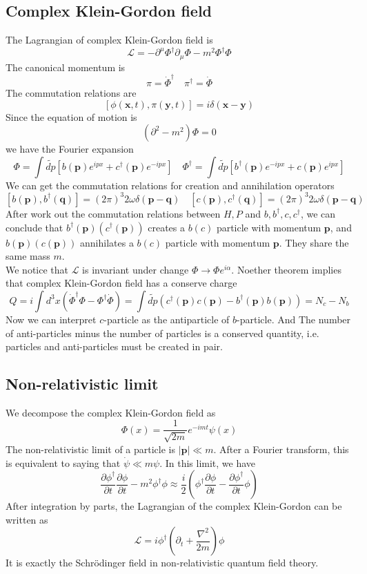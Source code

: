 \subsection{Complex Klein-Gordon field}
The Lagrangian of complex Klein-Gordon field is
\[\mathcal{L} = - \partial^{\mu}\Phi^{\dagger}\partial_{\mu}\Phi - m^2\Phi^{\dagger}\Phi\]
The canonical momentum is
\[\pi = \dot{\Phi}^{\dagger} \quad \pi^{\dagger} = \dot{\Phi}\]
The commutation relations are
\[[\phi(\bm{x},t),\pi(\bm{y},t)] = i\delta(\bm{x}-\bm{y})\]
Since the equation of motion is
\[(\partial^2-m^2)\Phi = 0\]
we have the Fourier expansion
\[\Phi = \int \widetilde{dp} [b(\bm{p})e^{ipx} + c^{\dagger}(\bm{p})e^{-ipx}] \quad \Phi^{\dagger} = \int \widetilde{dp} [b^{\dagger}(\bm{p})e^{-ipx} + c(\bm{p})e^{ipx}]\]
We can get the commutation relations for creation and annihilation operators
\[[b(\bm{p}), b^{\dagger}(\bm{q})] = (2\pi)^3 2\omega \delta(\bm{p}-\bm{q}) \quad [c(\bm{p}), c^{\dagger}(\bm{q})] = (2\pi)^3 2\omega \delta(\bm{p}-\bm{q})\]
After work out the commutation relations between $H,P$ and $b,b^{\dagger},c,c^{\dagger}$, we can conclude that $b^{\dagger}(\bm{p})(c^{\dagger}(\bm{p}))$ creates a $b(c)$ particle with momentum $\bm{p}$, and $b(\bm{p})(c(\bm{p}))$ annihilates a $b(c)$ particle with momentum $\bm{p}$. They share the same mass $m$.
\\
We notice that $\mathcal{L}$ is invariant under change $\Phi \to \Phi e^{i\alpha}$. Noether theorem implies that complex Klein-Gordon field has a conserve charge
\[Q = i\int d^3x (\dot{\Phi}^{\dagger}\Phi - \Phi^{\dagger}\dot{\Phi}) = \int \widetilde{dp} (c^{\dagger}(\bm{p})c(\bm{p}) - b^{\dagger}(\bm{p})b(\bm{p})) = N_c - N_b\]
Now we can interpret $c$-particle as the antiparticle of $b$-particle. And The number of anti-particles minus the number of particles is a conserved quantity, i.e. particles and anti-particles must be created in pair.

\subsection{Non-relativistic limit}
We decompose the complex Klein-Gordon field as
\[\Phi(x) = \frac{1}{\sqrt{2m}} e^{-imt}\psi(x)\]
The non-relativistic limit of a particle is $|\bm{p}| \ll m$. After a Fourier transform, this is equivalent to saying that $\dot{\psi} \ll m\psi $. In this limit, we have
\[\frac{\partial \phi^{\dagger}}{\partial t} \frac{\partial \phi}{\partial t} - m^2 \phi^{\dagger}\phi \approx \frac{i}{2} \left( \phi^{\dagger}\frac{\partial \phi}{\partial t} - \frac{\partial \phi^{\dagger}}{\partial t} \phi\right)\]
After integration by parts, the Lagrangian of the complex Klein-Gordon can be written as
\[\mathcal{L} = i\phi^{\dagger}\left(\partial_t + \frac{\nabla^2}{2m} \right)\phi\]
It is exactly the Schr\"{o}dinger field in non-relativistic quantum field theory.